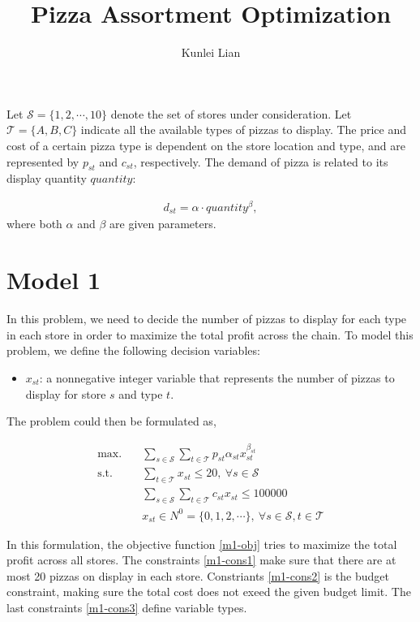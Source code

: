 \documentclass[a4, 11pt]{article}
\begin{document}
\title{\vspace{-4cm}Pizza Assortment Optimization}
\author{Kunlei Lian}
\maketitle

Let $\mathcal{S} = \{1, 2, \cdots, 10\}$ denote the set of stores under consideration.
Let $\mathcal{T} = \{A, B, C\}$ indicate all the available types of pizzas to display.
The price and cost of a certain pizza type is dependent on the store location and type, and are represented by $p_{st}$ and $c_{st}$, respectively.
The demand of pizza is related to its display quantity $quantity$:

\begin{align}
	d_{st} = \alpha \cdot quantity^{\beta},
\end{align} 
where both $\alpha$ and $\beta$ are given parameters.

\section{Model 1}
In this problem, we need to decide the number of pizzas to display for each type in each store in order to maximize the total profit across the chain.
To model this problem, we define the following decision variables:

\begin{itemize}
	\item $x_{st}$: a nonnegative integer variable that represents the number of pizzas to display for store $s$ and type $t$.
\end{itemize}

The problem could then be formulated as,

\begin{align}
	\text{max.} &\quad \sum_{s \in \mathcal{S}} \sum_{t \in \mathcal{T}} p_{st} \alpha_{st} x_{st}^{\beta_{st}} \label{m1-obj} \\
	\text{s.t.} &\quad  \sum_{t \in \mathcal{T}} x_{st} \leq 20, \ \forall s \in \mathcal{S} \label{m1-cons1} \\
	&\quad \sum_{s \in \mathcal{S}} \sum_{t \in \mathcal{T}} c_{st} x_{st} \leq 100000 \label{m1-cons2} \\
	&\quad x_{st} \in N^0 = \{0, 1, 2, \cdots\}, \ \forall s \in \mathcal{S}, t \in \mathcal{T} \label{m1-cons3}
\end{align}

In this formulation, the objective function \eqref{m1-obj} tries to maximize the total profit across all stores.
The constraints \eqref{m1-cons1} make sure that there are at most 20 pizzas on display in each store.
Constriants \eqref{m1-cons2} is the budget constraint, making sure the total cost does not exeed the given budget limit.
The last constraints \eqref{m1-cons3} define variable types.
\end{document}
